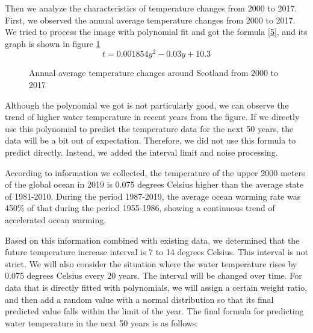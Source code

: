 \documentclass{mcmthesis}
\numberwithin{figure}{section}
\numberwithin{table}{section}
\begin{document}
Then we analyze the characteristics of temperature changes from 2000 to 2017. First, we observed the annual average temperature changes from 2000 to 2017. We tried to process the image with polynomial fit and got the formula \ref{5}, and its graph is shown in figure \ref{FunctionGraph}
\begin{equation}\label{5}
  t = 0.001854 y^2 - 0.03 y + 10.3
  \end{equation}

  \begin{figure}[H]
    \caption{Annual average temperature changes around Scotland from 2000 to 2017}\label{FunctionGraph}
  \end{figure}
Although the polynomial we got is not particularly good, we can observe the trend of higher water temperature in recent years from the figure. If we directly use this polynomial to predict the temperature data for the next 50 years, the data will be a bit out of expectation. Therefore, we did not use this formula to predict directly. Instead, we added the interval limit and noise processing.

According to information we collected, the temperature of the upper 2000 meters of the global ocean in 2019 is 0.075 degrees Celsius higher than the average state of 1981-2010. During the period 1987-2019, the average ocean warming rate was 450\% of that during the period 1955-1986, showing a continuous trend of accelerated ocean warming. 

Based on this information combined with existing data, we determined that the future temperature increase interval is 7 to 14 degrees Celsius. This interval is not strict. We will also consider the situation where the water temperature rises by 0.075 degrees Celsius every 20 years. The interval will be changed over time. For data that is directly fitted with polynomials, we will assign a certain weight ratio, and then add a random value with a normal distribution so that its final predicted value falls within the limit of the year. The final formula for predicting water temperature in the next 50 years is as follows:
\end{document}
